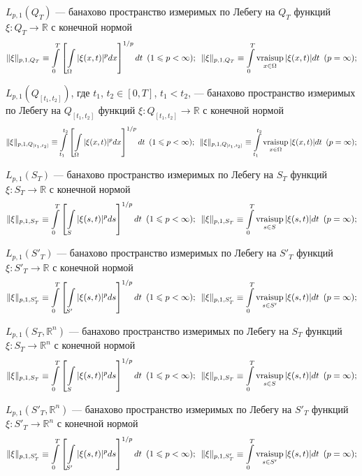 \documentclass{report}
\newcommand{\vraisup}{\mathop{\rm vraisup}}
\begin{document}
$L_{p,1}(Q_T)$ --- банахово пространство измеримых по Лебегу на $Q_T$ функций $\xi\colon Q_T\to \mathbb{R}$ с конечной нормой
\begin{gather*}
\|\xi\|_{p,1,Q_T}\equiv\int\limits_0^T\left[\int\limits_\Omega|\xi(x,t)|^pdx\right]^{1/p}dt\,\,\,(1\leqslant p<\infty);\,\,\,
\|\xi\|_{p,1,Q_T}\equiv\int\limits_0^T\vraisup\limits_{x\in\Omega}|\xi(x,t)|dt\,\,\,(p=\infty);
\end{gather*}

$L_{p,1}(Q_{[t_1,t_2]})$, где $t_1$, $t_2\in[0,T]$, $t_1< t_2$,  --- банахово пространство измеримых по Лебегу на $Q_{[t_1,t_2]}$
функций $\xi\colon Q_{[t_1,t_2]}\to \mathbb{R}$ с конечной нормой
\begin{gather*}
\|\xi\|_{p,1,Q_{[t_1,t_2]}}\equiv\int\limits_{t_1}^{t_2}\left[\int\limits_\Omega|\xi(x,t)|^pdx\right]^{1/p}dt\,\,\,(1\leqslant p<\infty);
\,\,\,\|\xi\|_{p,1,Q_{[t_1,t_2]}}\equiv\int\limits_{t_1}^{t_2}\vraisup\limits_{x\in\Omega}|\xi(x,t)|dt\,\,\,(p=\infty);
\end{gather*}

$L_{p,1}(S_T)$ --- банахово пространство измеримых по Лебегу на $S_T$ функций $\xi\colon S_T\to \mathbb{R}$ с конечной нормой
\begin{gather*}
\|\xi\|_{p,1,S_T}\equiv\int\limits_0^T\left[\int\limits_S|\xi(s,t)|^pds\right]^{1/p}dt\,\,\,(1\leqslant p<\infty);\,\,\,
\|\xi\|_{p,1,S_T}\equiv\int\limits_0^T\vraisup\limits_{s\in S}|\xi(s,t)|dt\,\,\,(p=\infty);
\end{gather*}

$L_{p,1}(S'_T)$ --- банахово пространство измеримых по Лебегу на $S'_T$ функций $\xi\colon S'_T\to \mathbb{R}$ с конечной нормой
\begin{gather*}
\|\xi\|_{p,1,S'_T}\equiv\int\limits_0^T\left[\int\limits_{S'}|\xi(s,t)|^pds\right]^{1/p}dt\,\,\,(1\leqslant p<\infty);\,\,\,
\|\xi\|_{p,1,S'_T}\equiv\int\limits_0^T\vraisup\limits_{s\in S'}|\xi(s,t)|dt\,\,\,(p=\infty);
\end{gather*}


$L_{p,1}(S_T,\mathbb{R}^n)$ --- банахово пространство измеримых по Лебегу на $S_T$ функций $\xi\colon S_T\to\mathbb{R}^n$ с конечной нормой
\begin{gather*}
\|\xi\|_{p,1,S_T}\equiv\int\limits_0^T\left[\int\limits_S|\xi(s,t)|^pds\right]^{1/p}dt\,\,\,(1\leqslant p<\infty);\,\,\,
\|\xi\|_{p,1,S_T}\equiv\int\limits_0^T\vraisup\limits_{s\in S}|\xi(s,t)|dt\,\,\,(p=\infty);
\end{gather*}

$L_{p,1}(S'_T,\mathbb{R}^n)$ --- банахово пространство измеримых по Лебегу на $S'_T$ функций $\xi\colon S'_T\to\mathbb{R}^n$ с конечной
нормой
\begin{gather*}
\|\xi\|_{p,1,S'_T}\equiv\int\limits_0^T\left[\int\limits_{S'}|\xi(s,t)|^pds\right]^{1/p}dt\,\,\,(1\leqslant p<\infty);\,\,\,
\|\xi\|_{p,1,S'_T}\equiv\int\limits_0^T\vraisup\limits_{s\in S'}|\xi(s,t)|dt\,\,\,(p=\infty);
\end{gather*}
\end{document}
